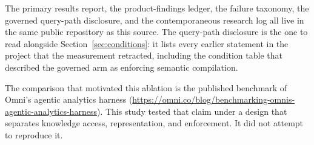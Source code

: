 The primary results report, the product-findings ledger, the failure taxonomy,
the governed query-path disclosure, and the contemporaneous research log all live
in the same public repository as this source. The query-path disclosure is the
one to read alongside Section~\ref{sec:conditions}: it lists every earlier
statement in the project that the measurement retracted, including the condition
table that described the governed arm as enforcing semantic compilation.

The comparison that motivated this ablation is the published benchmark of Omni's
agentic analytics harness
(\url{https://omni.co/blog/benchmarking-omnis-agentic-analytics-harness}). This
study tested that claim under a design that separates knowledge access,
representation, and enforcement. It did not attempt to reproduce it.
